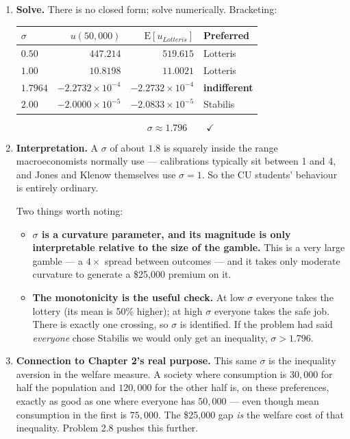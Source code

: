 \documentclass[12pt, letterpaper]{article}
\newcommand{\E}{\mathrm{E}}
\begin{document}
\begin{tcolorbox}[oddbox,title={Problem 2.7 \quad Measuring Risk Aversion}]
\begin{enumerate}
\item \textbf{Solve.} There is no closed form; solve numerically. Bracketing:
\begin{center}
\begin{tabular}{lrrl}
\toprule
$\sigma$ & $u(50{,}000)$ & $\E[u_{Lotteris}]$ & Preferred \\
\midrule
$0.50$ & $447.214$ & $519.615$ & Lotteris \\
$1.00$ & $10.8198$ & $11.0021$ & Lotteris \\
$\mathbf{1.7964}$ & $-2.2732\!\times\!10^{-4}$ & $-2.2732\!\times\!10^{-4}$ & \textbf{indifferent} \\
$2.00$ & $-2.0000\!\times\!10^{-5}$ & $-2.0833\!\times\!10^{-5}$ & Stabilis \\
\bottomrule
\end{tabular}
\end{center}
$$\boxed{\sigma \approx 1.796} \qquad \checkmark$$

\item \textbf{Interpretation.} A $\sigma$ of about $1.8$ is squarely inside the range
macroeconomists normally use --- calibrations typically sit between 1 and 4, and Jones and
Klenow themselves use $\sigma = 1$. So the CU students' behaviour is entirely ordinary.

Two things worth noting:
\begin{itemize}[leftmargin=1.3em,itemsep=3pt,topsep=2pt]
\item \textbf{$\sigma$ is a curvature parameter, and its magnitude is only interpretable
relative to the size of the gamble.} This is a very large gamble --- a $4\times$ spread
between outcomes --- and it takes only moderate curvature to generate a \$25,000
premium on it.
\item \textbf{The monotonicity is the useful check.} At low $\sigma$ everyone takes the
lottery (its mean is 50\% higher); at high $\sigma$ everyone takes the safe job. There
is exactly one crossing, so $\sigma$ is identified. If the problem had said
\emph{everyone} chose Stabilis we would only get an inequality, $\sigma > 1.796$.
\end{itemize}

\item \textbf{Connection to Chapter 2's real purpose.} This same $\sigma$ is the inequality
aversion in the welfare measure. A society where consumption is $30{,}000$ for half the
population and $120{,}000$ for the other half is, on these preferences, exactly as good as
one where everyone has $50{,}000$ --- even though mean consumption in the first is $75{,}000$.
The \$25,000 gap \emph{is} the welfare cost of that inequality. Problem 2.8 pushes this
further.


\end{enumerate}
\end{tcolorbox}
\end{document}
